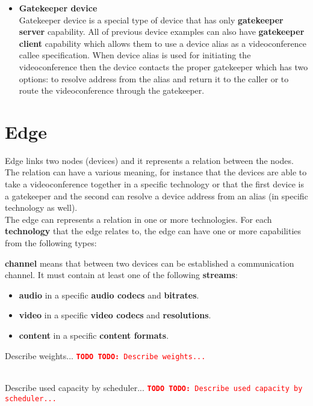 \documentclass[a4paper]{report}
\newcommand{\TODO}[1]{%
\def\empty{}%
\def\prvniparametr{#1}%
\ifx\prvniparametr\empty%
\begingroup\tt\textcolor{red}{\noindent\textbf{TODO}}\endgroup
\else%
\begingroup\tt\textcolor{red}{\noindent\textbf{TODO:}\ #1}\endgroup
\fi%
}
\begin{document}
\begin{itemize}
\item \textbf{Gatekeeper device} \\
  Gatekeeper device is a special type of device that has only 
  \textbf{gatekeeper server} capability. All of previous device examples can 
  also have \textbf{gatekeeper client} capability which allows them to use a 
  device alias as a videoconference callee specification. When device alias is 
  used for initiating the videoconference then the device contacts the proper 
  gatekeeper which has two options: to resolve address from the alias and 
  return it to the caller or to route the videoconference through the 
  gatekeeper.
\end{itemize}
 

\section{Edge}

Edge links two nodes (devices) and it represents a relation between the 
nodes. The relation can have a various meaning, for instance that the devices
are able to take a videoconference together in a specific technology or
that the first device is a gatekeeper and the second can resolve a device 
address from an alias (in specific technology as well).
\\
The edge can represents a relation in one or more technologies. For each \textbf{technology} that the edge relates to, the edge can have one or more 
capabilities from the following types:
\begin{compactitem}   
\item \textbf{channel} means that between two devices can be established
  a communication channel. It must contain at least one of the following 
  \textbf{streams}:
  \begin{itemize}
    \item \textbf{audio} in a specific \textbf{audio codecs} and 
      \textbf{bitrates}.
    \item \textbf{video} in a specific \textbf{video codecs} and 
      \textbf{resolutions}.
    \item \textbf{content} in a specific \textbf{content formats}.
  \end{itemize} 
  
\item \TODO{Describe weights...}
   \\ \TODO{Describe used capacity by scheduler...}
\end{compactitem}   
  
\end{document}
